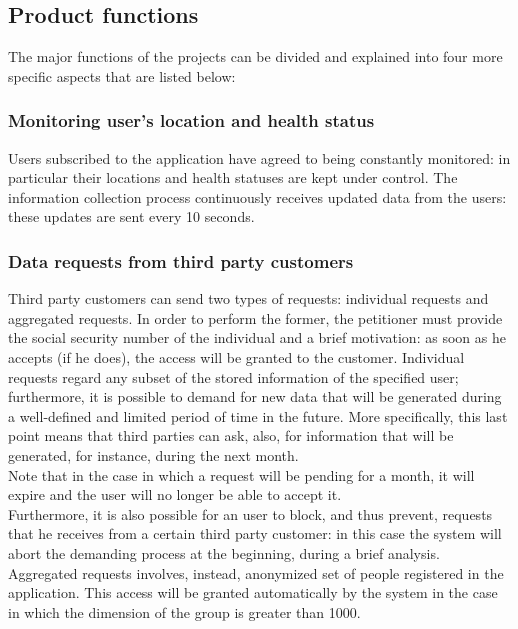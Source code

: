 \subsection{Product functions}
The major functions of the projects can be divided and explained into four more specific aspects that are listed below: 

\subsubsection{Monitoring user's location and health status}
Users subscribed to the application have agreed to being constantly monitored: in particular their locations and health statuses are kept under control. 
The information collection process continuously receives updated data from the users: these updates are sent every 10 seconds. \\

\subsubsection{Data requests from third party customers}
Third party customers can send two types of requests: individual requests and aggregated requests. 
In order to perform the former, the petitioner must provide the social security number of the individual and a brief motivation: as soon as he accepts (if he does), the access will be granted to the customer.
Individual requests regard any subset of the stored information of the specified user; furthermore, it is possible to demand for new data that will be generated during a well-defined and limited period of time in the future. 
More specifically, this last point means that third parties can ask, also, for information that will be generated, for instance, during the next month. \\
Note that in the case in which a request will be pending for a month, it will expire and the user will no longer be able to accept it. \\
Furthermore, it is also possible for an user to block, and thus prevent, requests that he receives from a certain third party customer: in this case the system will abort the demanding process at the beginning, during a brief analysis.\\
Aggregated requests involves, instead, anonymized set of people registered in the application. 
This access will be granted automatically by the system in the case in which the dimension of the group is greater than 1000.   

